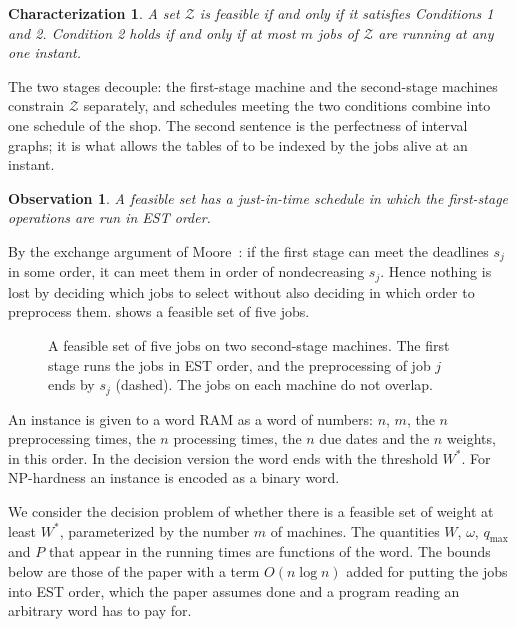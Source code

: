 \documentclass[11pt,a4paper]{article}
\newtheorem{observation}{Observation}
\theoremstyle{definition}
\theoremstyle{plain}
\newtheorem*{characterization}{Characterization}
\newcommand{\qmax}{q_{\max}}
\newcommand{\NP}{\textnormal{\textsf{NP}}}
\newcommand{\calZ}{\mathcal{Z}}
\begin{document}
\begin{characterization}
A set $\calZ$ is feasible if and only if it satisfies Conditions 1 and 2. Condition 2 holds if
and only if at most $m$ jobs of $\calZ$ are running at any one instant.
\end{characterization}
The two stages decouple: the first-stage machine and the second-stage machines constrain
$\calZ$ separately, and schedules meeting the two conditions combine into one schedule of the
shop. The second sentence is the perfectness of interval graphs; it is what allows the tables
of  to be indexed by the jobs alive at an instant.

\begin{observation}\label{obs:EST}
A feasible set has a just-in-time schedule in which the first-stage operations are run in EST
order.
\end{observation}
By the exchange argument of Moore~\cite{Moore68}: if the first stage can meet the deadlines
$s_j$ in some order, it can meet them in order of nondecreasing $s_j$. Hence nothing is lost by
deciding which jobs to select without also deciding in which order to preprocess them.
 shows a feasible set of five jobs.

\begin{figure}[tb]
    \centering
    
    \caption{A feasible set of five jobs on two second-stage machines. The first stage runs the
    jobs in EST order, and the preprocessing of job $j$ ends by $s_j$ (dashed). The jobs on
    each machine do not overlap.}
    \label{fig:est}
\end{figure}

An instance is given to a word RAM as a word of numbers: $n$, $m$, the $n$ preprocessing times,
the $n$ processing times, the $n$ due dates and the $n$ weights, in this order. In the decision
version the word ends with the threshold $W^*$.
For \NP-hardness an instance is encoded as a binary word.

We consider the decision problem of whether there is a feasible set of weight at least $W^*$,
parameterized by the number $m$ of machines. The quantities $W$, $\omega$, $\qmax$ and $P$ that
appear in the running times are functions of the word. The bounds below are those of the paper
with a term $O(n\log n)$ added for putting the jobs into EST order, which the paper assumes
done and a program reading an arbitrary word has to pay for.
\end{document}
